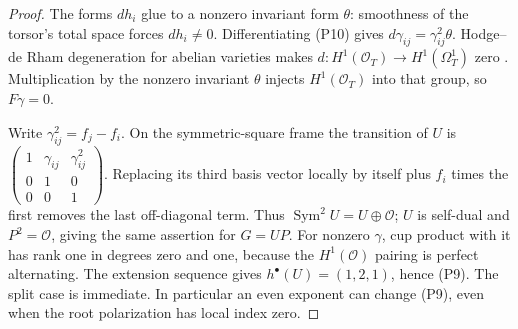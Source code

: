 \documentclass[11pt]{article}
\theoremstyle{definition}\newtheorem{definition}[theorem]{Definition}
\theoremstyle{remark}\newtheorem{remark}[theorem]{Remark}
\newcommand{\OO}{\mathcal O}
\begin{document}
\begin{proof}
The forms $dh_i$ glue to a nonzero invariant form $\theta$: smoothness of the torsor's total space forces $dh_i\ne0$. Differentiating (P10) gives $d\gamma_{ij}=\gamma_{ij}^2\theta$. Hodge--de Rham degeneration for abelian varieties makes $d:H^1(\OO_T)\to H^1(\Omega_T^1)$ zero \citep[Corollary~7.29 and proof, pp.~108--109]{EGM}. Multiplication by the nonzero invariant $\theta$ injects $H^1(\OO_T)$ into that group, so $F\gamma=0$.

Write $\gamma_{ij}^2=f_j-f_i$. On the symmetric-square frame the transition of $U$ is
$\left(\begin{smallmatrix}1&\gamma_{ij}&\gamma_{ij}^2\\0&1&0\\0&0&1\end{smallmatrix}\right)$.
Replacing its third basis vector locally by itself plus $f_i$ times the first removes the last off-diagonal term. Thus $\operatorname{Sym}^2U=U\oplus\OO$; $U$ is self-dual and $P^2=\OO$, giving the same assertion for $G=UP$. For nonzero $\gamma$, cup product with it has rank one in degrees zero and one, because the $H^1(\OO)$ pairing is perfect alternating. The extension sequence gives $h^\bullet(U)=(1,2,1)$, hence (P9). The split case is immediate. In particular an even exponent can change (P9), even when the root polarization has local index zero.
\end{proof}
\end{document}
